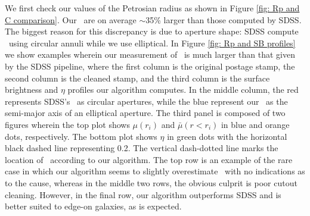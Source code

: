We first check our values of the Petrosian radius as shown in Figure \ref{fig: Rp and C comparison}. Our \rp~are on average $\sim$35\% larger than those computed by SDSS. The biggest reason for this discrepancy is due to aperture shape: SDSS compute \rp~using circular annuli while we use elliptical. In Figure \ref{fig: Rp and SB profiles} we show examples wherein our measurement of \rp~is much larger than that given by the SDSS pipeline, where the first column is the original postage stamp, the second column is the cleaned stamp, and the third column is the surface brightness and $\eta$ profiles our algorithm computes. In the middle column, the red represents SDSS's \rp~as circular apertures, while the blue represent our \rp~as the semi-major axis of an elliptical aperture. The third panel is composed of two figures wherein the top plot shows $\mu(r_i)$ and $\bar\mu(r<r_i)$ in blue and orange dots, respectively. The bottom plot shows $\eta$ in green dots with the horizontal black dashed line representing 0.2. The vertical dash-dotted line marks the location of \rp~according to our algorithm. The top row is an example of the rare case in which our algorithm seems to slightly overestimate \rp~with no indications as to the cause, whereas in the middle two rows, the obvious culprit is poor cutout cleaning. However, in the final row, our algorithm outperforms SDSS and is better suited to edge-on galaxies, as is expected.



